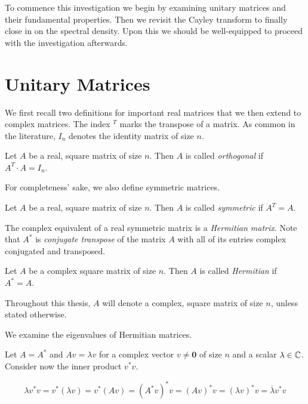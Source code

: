 To commence this investigation we begin by examining unitary matrices and their fundamental properties.
Then we revisit the Cayley transform to finally close in on the spectral density.
Upon this we should be well-equipped to proceed with the investigation afterwards.

\section{Unitary Matrices}

We first recall two definitions for important real matrices that we then extend to complex matrices.
The index $^T$ marks the transpose of a matrix.
As common in the literature, $I_n$ denotes the identity matrix of size $n$.

\begin{definition}
    Let $A$ be a real, square matrix of size $n$.
    Then $A$ is called \emph{orthogonal} if $A^T \cdot A = I_n$.
\end{definition}

For completeness' sake, we also define symmetric matrices.

\begin{definition}
    Let $A$ be a real, square matrix of size $n$.
    Then $A$ is called \emph{symmetric} if $A^T = A$.
\end{definition}

The complex equivalent of a real symmetric matrix is a \emph{Hermitian matrix}.
Note that $A^*$ is \emph{conjugate transpose} of the matrix $A$ with all of its entries complex conjugated and transposed.

\begin{definition}
    Let $A$ be a complex square matrix of size $n$.
    Then $A$ is called \emph{Hermitian} if $A^* = A$.
\end{definition}

Throughout this thesis, $A$ will denote a complex, square matrix of size $n$,
unless stated otherwise.

We examine the eigenvalues of Hermitian matrices.

Let $A = A^*$ and $A v = \lambda v$ for a complex vector $v \neq \mathbf{0}$ of size $n$ and a scalar $\lambda \in \mathbb{C}$.
Consider now the inner product $ v^* v$.

\begin{equation} \label{eq:real_symmetric_inner_product}
    \lambda v^* v = v^* \left( \lambda v \right)
    = v^* \left( A v \right)
    = \left( A^* v \right)^* v
    = \left( A v \right)^* v
    = (\lambda v)^* v
    = \overline{\lambda} v^* v
\end{equation}

